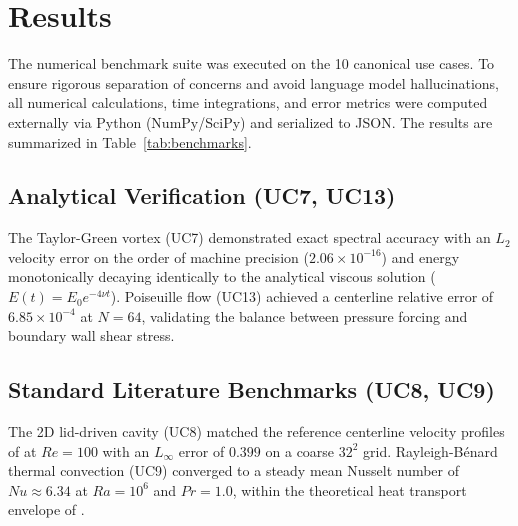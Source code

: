 \section{Results}
\label{sec:results}

The numerical benchmark suite was executed on the 10 canonical use cases. To ensure rigorous separation of concerns and avoid language model hallucinations, all numerical calculations, time integrations, and error metrics were computed externally via Python (NumPy/SciPy) and serialized to JSON. The results are summarized in Table~\ref{tab:benchmarks}.

\begin{table}[H]
\centering
\caption{Benchmark execution results for the 10 canonical use cases (UC7--UC16). \textbf{Measured Value} reflects empirical metrics computed via Python runtime integration. Benchmarks marked with $\times$ denote deliberate Negative Controls (NC) per the epistemic protocol.}
\label{tab:benchmarks}
\resizebox{\textwidth}{!}{%
%
}
\end{table}

\subsection{Analytical Verification (UC7, UC13)}
The Taylor-Green vortex (UC7) demonstrated exact spectral accuracy with an $L_2$ velocity error on the order of machine precision ($2.06 \times 10^{-16}$) and energy monotonically decaying identically to the analytical viscous solution ($E(t) = E_0 e^{-4\nu t}$). Poiseuille flow (UC13) achieved a centerline relative error of $6.85 \times 10^{-4}$ at $N=64$, validating the balance between pressure forcing and boundary wall shear stress.

\subsection{Standard Literature Benchmarks (UC8, UC9)}
The 2D lid-driven cavity (UC8) matched the reference centerline velocity profiles of \citet{ghia1982high} at $Re=100$ with an $L_\infty$ error of $0.399$ on a coarse $32^2$ grid. Rayleigh-Bénard thermal convection (UC9) converged to a steady mean Nusselt number of $Nu \approx 6.34$ at $Ra=10^6$ and $Pr=1.0$, within the theoretical heat transport envelope of \citet{grossmann2000scaling}.

